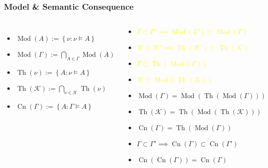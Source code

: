 \documentclass[UTF8,aspectratio=43,11pt,colorlinks,compress,openany]{beamer}%
\begin{document}
\begin{frame}\frametitle{Model \& Semantic Consequence}
\begin{columns}
	\begin{itemize}
		\item $\operatorname{Mod}(A):=\left\{\nu: \nu\vDash A\right\}$
		\item $\operatorname{Mod}(\Gamma):=\bigcap\limits_{A\in\Gamma}\operatorname{Mod}(A)$
		\item $\operatorname{Th}(\nu):=\left\{A: \nu\vDash A\right\}$
		\item $\operatorname{Th}(\mathcal{K}):=\bigcap\limits_{\nu\in\mathcal{K}}\operatorname{Th}(\nu)$
		\item $\operatorname{Cn}(\Gamma):=\left\{A: \Gamma\vDash A\right\}$
	\end{itemize}
	\begin{block}{}
		\begin{itemize}
			\item \textcolor{yellow}{$\Gamma\subset\Gamma'\implies\operatorname{Mod}(\Gamma')\subset\operatorname{Mod}(\Gamma)$}
			\item \textcolor{yellow}{$\mathcal{K}\subset\mathcal{K}'\implies\operatorname{Th}(\mathcal{K}')\subset\operatorname{Th}(\mathcal{K})$}
			\item \textcolor{yellow}{$\Gamma\subset\operatorname{Th}(\operatorname{Mod}(\Gamma))$}
			\item \textcolor{yellow}{$\mathcal{K}\subset\operatorname{Mod}(\operatorname{Th}(\mathcal{K}))$}
			\item $\operatorname{Mod}(\Gamma)=\operatorname{Mod}(\operatorname{Th}(\operatorname{Mod}(\Gamma)))$
			\item $\operatorname{Th}(\mathcal{K})=\operatorname{Th}(\operatorname{Mod}(\operatorname{Th}(\mathcal{K})))$
			\item $\operatorname{Cn}(\Gamma)=\operatorname{Th}(\operatorname{Mod}(\Gamma))$
			\item $\Gamma\subset\Gamma'\implies \operatorname{Cn}(\Gamma)\subset \operatorname{Cn}(\Gamma')$
			\item $\operatorname{Cn}(\operatorname{Cn}(\Gamma))=\operatorname{Cn}(\Gamma)$
		\end{itemize}
	\end{block}
\end{columns}
\end{frame}
\end{document}
